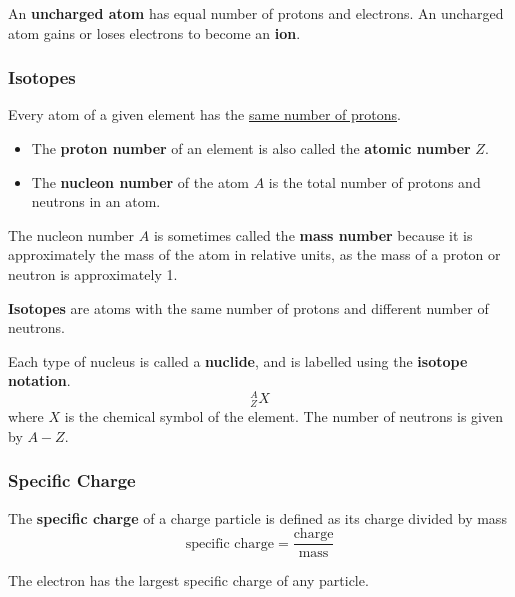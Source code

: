 An \textbf{uncharged atom} has equal number of protons and electrons. An uncharged atom gains or loses electrons to become an \textbf{ion}.

\subsubsection*{Isotopes}

Every atom of a given element has the \underline{same number of protons}.
\begin{itemize}
    \item The \textbf{proton number} of an element is also called the \textbf{atomic number} $Z$.
    \item The \textbf{nucleon number} of the atom $A$ is the total number of protons and neutrons in an atom.
\end{itemize}
The nucleon number $A$ is sometimes called the \textbf{mass number} because it is approximately the mass of the atom in relative units, as the mass of a proton or neutron is approximately 1.

\textbf{Isotopes} are atoms with the same number of protons and different number of neutrons.

Each type of nucleus is called a \textbf{nuclide}, and is labelled using the \textbf{isotope notation}.
$$^A_ZX$$
where $X$ is the chemical symbol of the element. The number of neutrons is given by $A-Z$.

\subsubsection*{Specific Charge}

The \textbf{specific charge} of a charge particle is defined as its charge divided by mass
$$\text{specific charge}=\frac{\text{charge}}{\text{mass}}$$

The electron has the largest specific charge of any particle.
